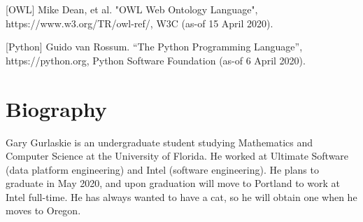 \documentclass[11pt]{article}
\begin{document}
[OWL] Mike Dean, et al. "OWL Web Ontology Language", https://www.w3.org/TR/owl-ref/, W3C (as-of 15 April 2020).

[Python] Guido van Rossum. “The Python Programming Language”, https://python.org, Python Software Foundation (as-of 6 April 2020).

\section*{Biography}
Gary Gurlaskie is an undergraduate student studying Mathematics and Computer Science at the University of Florida. He worked at Ultimate Software (data platform engineering) and Intel (software engineering). He plans to graduate in May 2020, and upon graduation will move to Portland to work at Intel full-time. He has always wanted to have a cat, so he will obtain one when he moves to Oregon.
\end{document}

